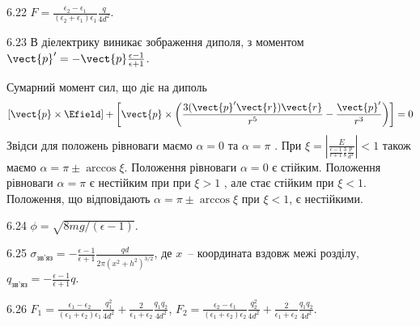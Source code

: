\begin{Solution}{6.{22}}
	$F = \frac{\epsilon_2 - \epsilon_1}{(\epsilon_2 + \epsilon_1)\epsilon_1} \frac{q}{4d^2}$.
\end{Solution}
\begin{Solution}{6.{23}}
	В діелектрику виникає зображення диполя, з моментом $\vect{p}' = -\vect{p}\frac{\epsilon - 1}{\epsilon + 1}$.

	Сумарний момент сил, що діє на диполь
    \[
        \left[\vect{p}\times\Efield\right] + \left[\vect{p}\times\left( \frac{3(\vect{p}'\vect{r})\vect{r}}{r^5} - \frac{\vect{p}'}{r^3} \right) \right] = 0
    \]
Звідси для положень рівноваги маємо $\alpha=0$ та $\alpha = \pi$ . При $\xi = \left|\frac{E}{\frac{\epsilon - 1}{\epsilon + 1} \frac38\frac{p}{d^3}}\right|<1$  також маємо $\alpha = \pi \pm \arccos\xi$.
Положення рівноваги $\alpha = 0$  є стійким. Положення рівноваги $\alpha = \pi$ є нестійким при при $\xi >1$ , але стає стійким при $\xi < 1$. Положення, що відповідають $\alpha = \pi \pm \arccos\xi$  при $\xi <1$, є нестійкими.
\end{Solution}
\begin{Solution}{6.{24}}
	$\phi = \sqrt{8mg/(\epsilon-1)}$.
\end{Solution}
\begin{Solution}{6.{25}}
	$\sigma_\text{зв'яз} = - \frac{\epsilon - 1}{\epsilon + 1} \frac{qd}{2\pi(x^2  +h^2)^{3/2}}$, де $x$~-- координата вздовж межі розділу, $q_\text{зв'яз} = - \frac{\epsilon - 1}{\epsilon + 1}q$.
\end{Solution}
\begin{Solution}{6.{26}}
	$F_1 = \frac{\epsilon_1 - \epsilon_2}{(\epsilon_1 + \epsilon_2)\epsilon_1} \frac{q_1^2}{4d^2} + \frac{2}{\epsilon_1 + \epsilon_2} \frac{q_1q_2}{4d^2}$,
	$F_2 = \frac{\epsilon_2 - \epsilon_1}{(\epsilon_1 + \epsilon_2)\epsilon_2} \frac{q_2^2}{4d^2} + \frac{2}{\epsilon_1 + \epsilon_2} \frac{q_1q_2}{4d^2}$.
\end{Solution}
